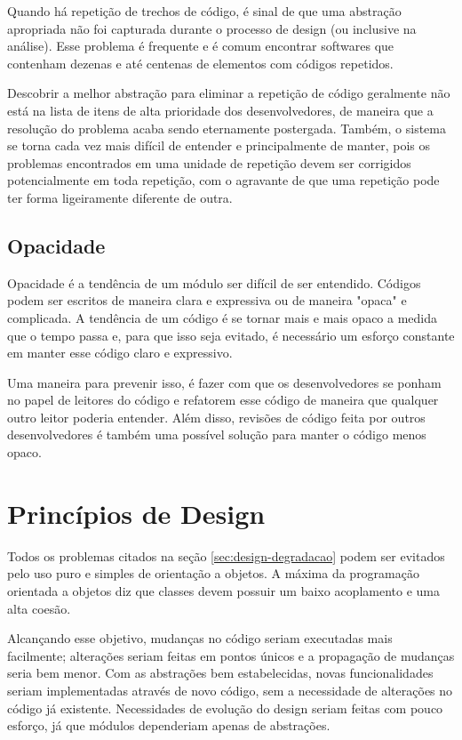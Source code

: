 Quando há repetição de trechos de código, é sinal de que uma abstração
apropriada não foi capturada durante o processo de design (ou inclusive na
análise). Esse problema é frequente e é comum encontrar softwares que contenham 
dezenas e até centenas de elementos com códigos repetidos. 

Descobrir a melhor abstração para eliminar a repetição de código geralmente não 
está na lista de itens de alta prioridade dos desenvolvedores, de maneira que a 
resolução do problema acaba sendo eternamente postergada. Também, o sistema se
torna cada vez mais difícil de entender e principalmente de manter, pois os 
problemas encontrados em uma unidade de repetição devem ser corrigidos
potencialmente  em toda repetição, com o agravante de que uma repetição pode
ter forma ligeiramente diferente de outra.

\subsection{Opacidade}

Opacidade é a tendência de um módulo ser difícil de ser entendido. Códigos podem
ser escritos de maneira clara e expressiva ou de maneira "opaca" e complicada. A
tendência de um código é se tornar mais e mais opaco a medida que o tempo passa
e, para que isso seja evitado, é necessário um esforço constante em manter esse 
código claro e expressivo. 

Uma maneira para prevenir isso, é fazer com que os desenvolvedores se ponham no
papel de leitores do código e refatorem esse código de maneira que qualquer
outro  leitor poderia entender. Além disso, revisões de código feita por outros
desenvolvedores é também uma possível solução para manter o código menos opaco.

\section{Princípios de Design}
\label{sec:design-oo-principios}

Todos os problemas citados na seção \ref{sec:design-degradacao} podem ser
evitados pelo uso puro e simples de orientação a objetos. A máxima da
programação orientada a objetos diz que classes devem possuir um baixo
acoplamento e uma alta coesão.

Alcançando esse objetivo, mudanças no código seriam executadas mais facilmente;
alterações seriam feitas em pontos únicos e a propagação de mudanças seria bem
menor. Com as abstrações bem estabelecidas, novas funcionalidades seriam
implementadas através de novo código, sem a necessidade de alterações no código
já existente. Necessidades de evolução do design seriam feitas com pouco
esforço, já que módulos dependeriam apenas de abstrações.

